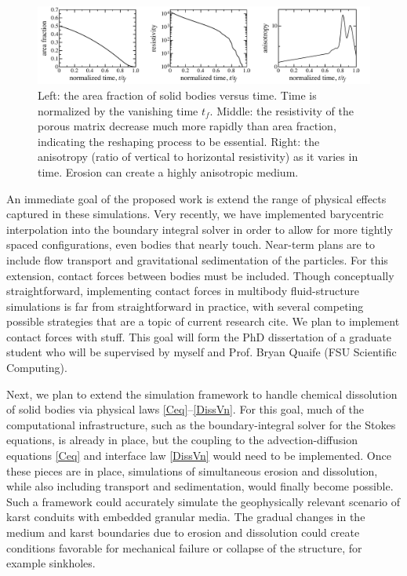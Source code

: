 \documentclass[12pt]{article}
\begin{document}
\begin{figure}%
\begin{center}
\includegraphics[width = 0.99 \textwidth]{./figs/fig3.pdf}
\caption{\label{fig3} Left: the area fraction of solid bodies versus time. Time is normalized by the vanishing time $t_f$. Middle: the resistivity of the porous matrix decrease much more rapidly than area fraction, indicating the reshaping process to be essential. Right: the anisotropy (ratio of vertical to horizontal resistivity) as it varies in time. Erosion can create a highly anisotropic medium.
}
\end{center}
\end{figure}

An immediate goal of the proposed work is extend the range of physical effects captured in these simulations. Very recently, we have implemented barycentric interpolation into the boundary integral solver in order to allow for more tightly spaced configurations, even bodies that nearly touch. Near-term plans are to include flow transport and gravitational sedimentation of the particles. For this extension, contact forces between bodies must be included. Though conceptually straightforward, implementing contact forces in multibody fluid-structure simulations is far from straightforward in practice, with several competing possible strategies that are a topic of current research  {\color{blue} cite}. We plan to implement contact forces with {\color{blue} stuff}. This goal will form the PhD dissertation of a graduate student who will be supervised by myself and Prof. Bryan Quaife (FSU Scientific Computing).

Next, we plan to extend the simulation framework to handle chemical dissolution of solid bodies via physical laws \eqref{Ceq}--\eqref{DissVn}. For this goal, much of the computational infrastructure, such as the boundary-integral solver for the Stokes equations, is already in place, but the coupling to the advection-diffusion equations \eqref{Ceq} and interface law \eqref{DissVn} would need to be implemented. Once these pieces are in place, simulations of simultaneous erosion and dissolution, while also including transport and sedimentation, would finally become possible. Such a framework could accurately simulate the geophysically relevant scenario of karst conduits with embedded granular media. The gradual changes in the medium and karst boundaries due to erosion and dissolution could create conditions favorable for mechanical failure or collapse of the structure, for example sinkholes.
\end{document}
